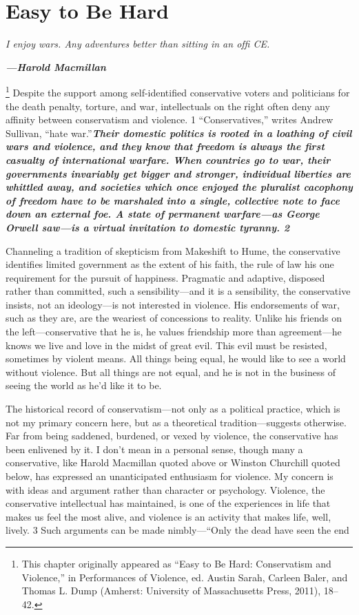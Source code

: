 {\chapter{Easy to Be Hard} } {\label{Easy to Be Hard} }{\par}{\textit{	I enjoy wars. Any adventures better than sitting in an ofﬁ CE.} } {\par}{\par} {\textbf{\textit{	—Harold Macmillan} } } {\par} 
{\footnote{This chapter originally appeared as “Easy to Be Hard: Conservatism and Violence,” in Performances of Violence, ed. Austin Sarah, Carleen Baler, and Thomas L. Dump (Amherst: University of Massachusetts Press, 2011), 18–42.} }	Despite the support among self-identified conservative voters and politicians for the death penalty, torture, and war, intellectuals on the right often deny any affinity between conservatism and violence. {\color{blue} 1 } “Conservatives,” writes Andrew Sullivan, “hate war.”{\textbf{\textit{Their domestic politics is rooted in a loathing of civil wars and violence, and they know that freedom is always the first casualty of international warfare. When countries go to war, their governments invariably get bigger and stronger, individual liberties are whittled away, and societies which once enjoyed the pluralist cacophony of freedom have to be marshaled into a single, collective note to face down an external foe. A state of permanent warfare—as George Orwell saw—is a virtual invitation to domestic tyranny. {\color{blue} 2 } } }} {\par} Channeling a tradition of skepticism from Makeshift to Hume, the conservative identifies limited government as the extent of his faith, the rule of law his one requirement for the pursuit of happiness. Pragmatic and adaptive, disposed rather than committed, such a sensibility—and it is a sensibility, the conservative insists, not an ideology—is not interested in violence. His endorsements of war, such as they are, are the weariest of concessions to reality. Unlike his friends on the left—conservative that he is, he values friendship more than agreement—he knows we live and love in the midst of great evil. This evil must be resisted, sometimes by violent means. All things being equal, he would like to see a world without violence. But all things are not equal, and he is not in the business of seeing the world as he’d like it to be.{\par} The historical record of conservatism—not only as a political practice, which is not my primary concern here, but as a theoretical tradition—suggests otherwise. Far from being saddened, burdened, or vexed by violence, the conservative has been enlivened by it. I don’t mean in a personal sense, though many a conservative, like Harold Macmillan quoted above or Winston Churchill quoted below, has expressed an unanticipated enthusiasm for violence. My concern is with ideas and argument rather than character or psychology. Violence, the conservative intellectual has maintained, is one of the experiences in life that makes us feel the most alive, and violence is an activity that makes life, well, lively. {\color{blue} 3 } Such arguments can be made nimbly—“Only the dead have seen the end 